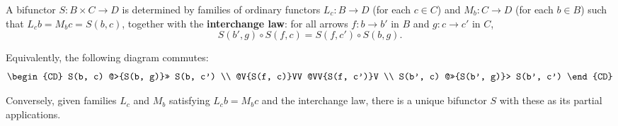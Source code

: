 A bifunctor $S: B \times C \to D$ is determined by families of ordinary functors $L_c: B \to D$ (for each $c \in C$) and $M_b: C \to D$ (for each $b \in B$) such that $L_c b = M_b c = S(b, c)$, together with the \textbf{interchange law}: for all arrows $f: b \to b'$ in $B$ and $g: c \to c'$ in $C$,
$$S(b', g) \circ S(f, c) = S(f, c') \circ S(b, g).$$

Equivalently, the following diagram commutes:
$$\begin{CD}
S(b, c) @>{S(b, g)}>> S(b, c') \\
@V{S(f, c)}VV @VV{S(f, c')}V \\
S(b', c) @>>{S(b', g)}> S(b', c')
\end{CD}$$

Conversely, given families $L_c$ and $M_b$ satisfying $L_c b = M_b c$ and the interchange law, there is a unique bifunctor $S$ with these as its partial applications.
